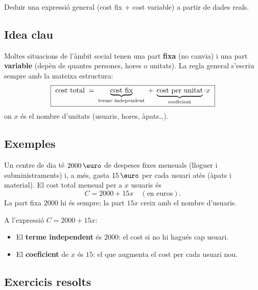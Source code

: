 %
{Deduir una expressió general (cost fix + cost variable) a partir de dades reals.}

\subsection{Idea clau}

Moltes situacions de l'àmbit social tenen una part \textbf{fixa} (no canvia) i una part
\textbf{variable} (depèn de quantes persones, hores o unitats). La regla general
s'escriu sempre amb la mateixa estructura:
\[
\boxed{\ \text{cost total} \;=\; \underbrace{\text{cost fix}}_{\text{terme independent}}
\;+\; \underbrace{\text{cost per unitat}}_{\text{coeficient}} \per x\ }
\]
on $x$ és el nombre d'unitats (usuaris, hores, àpats\ldots).

\subsection{Exemples}

\begin{exemple}
Un centre de dia té $\num{2000}\eur$ de despeses fixes mensuals (lloguer i
subministraments) i, a més, gasta $15\eur$ per cada usuari atès (àpats i material).
El cost total mensual per a $x$ usuaris és
\[
C = \num{2000} + 15x \quad(\text{en euros}).
\]
La part fixa $\num{2000}$ hi és sempre; la part $15x$ creix amb el nombre d'usuaris.
\end{exemple}

\begin{exemple}
A l'expressió $C=\num{2000}+15x$:
\begin{itemize}[leftmargin=1.4em, itemsep=2pt]
  \item El \textbf{terme independent} és $\num{2000}$: el cost si no hi hagués cap usuari.
  \item El \textbf{coeficient} de $x$ és $15$: el que augmenta el cost per cada usuari nou.
\end{itemize}
\end{exemple}

\subsection{Exercicis resolts}

